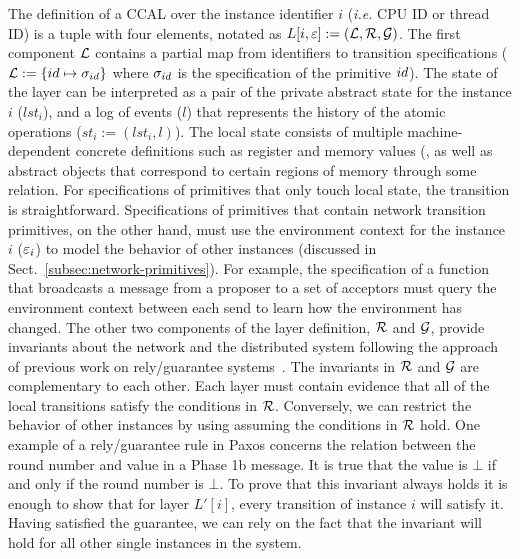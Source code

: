 {The definition of a  CCAL over the instance identifier $i$ (\textit{i.e.} CPU ID or thread ID)
is a tuple with four elements, notated as $L[i,{\varepsilon}] := (\mathcal{L}, \mathcal{R}, \mathcal{G})$.
The first component $\mathcal{L}$ contains a partial map from
identifiers to transition specifications
($\mathcal{L} := \{id \mapsto \sigma_{id}\}$ where $ \sigma_{id}$ is
the specification of the primitive $id$).
The state of the layer can be interpreted as a pair
of the private abstract state for the instance $i$ ($lst_i$), and
a log of events ($l$) that represents the history of the atomic operations ($st_i := (lst_i, l)$).
The local state consists of multiple machine-dependent concrete definitions such as register and memory values (,
as well as abstract objects that correspond to
certain regions of memory through some relation.
For specifications of primitives that only touch local state, the transition is straightforward.
Specifications of primitives that contain network transition primitives, on the other hand,
must use the environment context for the instance $i$ (${\varepsilon}_i$)
to model the behavior of other instances (discussed in Sect.~\ref{subsec:network-primitives}).
For example, the specification of a function that broadcasts a message from a proposer to a set of acceptors must query the environment context
between each send to learn how the environment has changed.
The other two components of the layer definition, $\mathcal{R}$ and $\mathcal{G}$,
provide invariants about the network and the distributed system
following the approach of previous work on rely/guarantee systems~\cite{RGSim, LRG}.
The invariants in $\mathcal{R}$ and $\mathcal{G}$ are complementary to each other.
Each layer must contain evidence that all of the local transitions satisfy the conditions in $\mathcal{R}$.
Conversely, we can restrict the behavior of other instances by using assuming the conditions in $\mathcal{R}$ hold.
One example of a rely/guarantee rule in Paxos concerns the relation between the round number and value in a Phase 1b message.
It is true that the value is $\bot$ if and only if the round number is $\bot$.
To prove that this invariant always holds it is enough to show that
for layer $L'[i]$, every transition of instance $i$ will satisfy it.
Having satisfied the guarantee, we can rely on the fact that the invariant will hold for all other single instances in the system.



}
